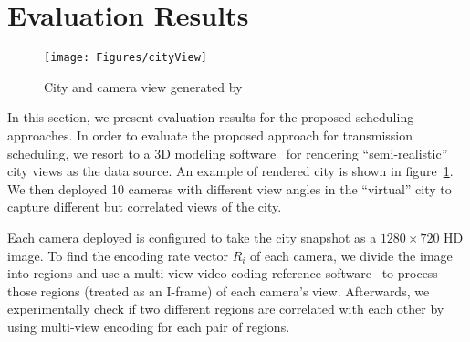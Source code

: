 \section{Evaluation Results}
\label{sec::evaluation}
\begin{figure}
\begin{center}
\texttt{[image: Figures/cityView]}
\caption{\label{fig::cityView}City and camera view generated by~\cite{Suicidator,Blender}}
\end{center}
\end{figure}
In this section, we present evaluation results for the proposed scheduling approaches.
In order to evaluate the proposed approach for transmission scheduling, we resort to a 3D modeling software~\cite{Suicidator,Blender} for rendering ``semi-realistic'' city views as the data source.
An example of rendered city is shown in figure~\ref{fig::cityView}.
We then deployed 10 cameras with different view angles in the ``virtual'' city to capture different but correlated views of the city.

Each camera deployed is configured to take the city snapshot as a $1280 \times 720$ HD image.
To find the encoding rate vector $R_i$ of each camera, we divide the image into regions and use a multi-view video coding reference software~\cite{JMVC} to process those regions (treated as an I-frame) of each camera's view.
Afterwards, we experimentally check if two different regions are correlated with each other by using multi-view encoding for each pair of regions.
%
